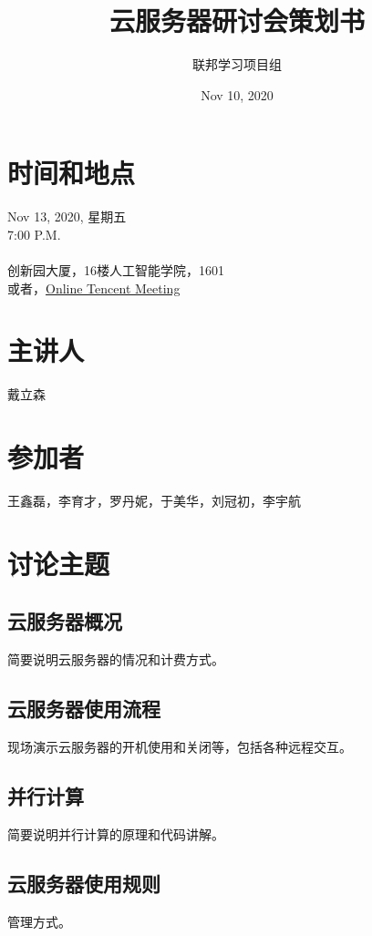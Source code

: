 \documentclass[12pt]{article}
\title{
    {云服务器研讨会策划书}
}
\date{Nov 10, 2020}
\author{联邦学习项目组}
\begin{document}
    \maketitle

    \section*{时间和地点}
        \begin{center}
            {\large Nov 13, 2020, 星期五} \\
            {\normalsize 7:00 P.M.} \\ 
            \hspace*{\fill} \\
            {\large 创新园大厦，16楼人工智能学院，1601} \\
            {\small 或者，\href{https://meeting.tencent.com/s/5A5VOzWXucmi}{Online Tencent Meeting}} \\

        \end{center}
        
    \section*{主讲人}
        \begin{center}
            戴立森
        \end{center}

    \section*{参加者}
        王鑫磊，李育才，罗丹妮，于美华，刘冠初，李宇航

    \clearpage

    \section*{讨论主题}
        \subsection*{云服务器概况}
            简要说明云服务器的情况和计费方式。
        \subsection*{云服务器使用流程}
            现场演示云服务器的开机使用和关闭等，包括各种远程交互。
        \subsection*{并行计算}
            简要说明并行计算的原理和代码讲解。
        \subsection*{云服务器使用规则}
            管理方式。
\end{document}

